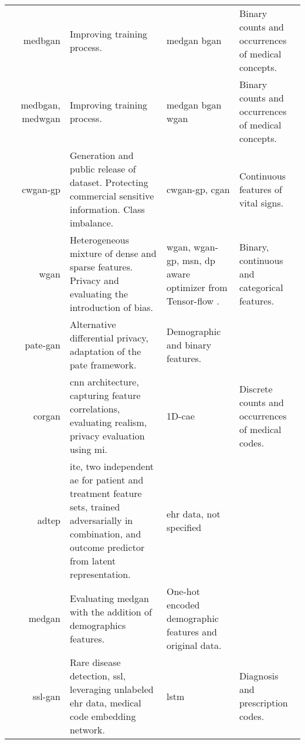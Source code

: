 \begin{center}
\begin{longtable}[l]{@{}p{}Rp{0.25\textwidth}Mp{0.20\textwidth}@{}}
        \citeauthor{baowaly_2019_IEEE} & \gls{medbgan}
        & Improving training process. & \gls{medgan} \gls{bgan}
        & Binary counts and occurrences of medical concepts.\\
        
        \citeauthor{baowaly_2019_jamia} & \gls{medbgan}, \gls{medwgan}
        & Improving training process. & \gls{medgan} \gls{bgan} \gls{wgan}
        & Binary counts and occurrences of medical concepts.\\
        
        \citeauthor{severo2019ward2icu} & \gls{cwgan-gp} 
        & Generation and public release of dataset. Protecting commercial sensitive information. Class imbalance.  & \gls{cwgan-gp}, \gls{cgan}
        & Continuous features of vital signs.\\
        
        \citeauthor{chin2019generation} & \gls{wgan}
        & Heterogeneous mixture of dense and sparse features. Privacy and evaluating the introduction of bias.  & \gls{wgan}, \gls{wgan-gp}, \gls{msn}, \gls{dp} aware optimizer from Tensor-flow \citeauthor{tensorflow-privacy}.
        & Binary, continuous and categorical features.\\
        
        \citeauthor{Jordon2019} & \gls{pate-gan}
        & Alternative differential privacy, adaptation of the  \gls{pate} framework.
        & Demographic and binary features.\\
        
        \citeauthor{torfi2019generating} & \gls{corgan}
        & \gls{cnn} architecture, capturing feature correlations, evaluating realism, privacy evaluation using \gls{mi}.  & 1D-\gls{cae}
        & Discrete counts and occurrences of medical codes.\\
    
        \citeauthor{chu2019treatment} & \gls{adtep}
        & \gls{ite}, two independent \gls{ae} for patient and treatment feature sets, trained adversarially in combination, and outcome predictor from latent representation. 
        & \gls{ehr} data, not specified\\
        
        \citeauthor{Jackson_2019} & \gls{medgan}
        & Evaluating medgan with the addition of demographics features.
        & One-hot encoded demographic features and original data. \\
        
        \citeauthor{yu2019rare} & \gls{ssl-gan}
        & Rare disease detection, \gls{ssl}, leveraging unlabeled \gls{ehr} data, medical code embedding network.  & \gls{lstm}
        & Diagnosis and prescription codes.\\
        

\end{longtable}
\end{center}
